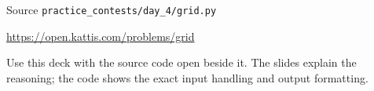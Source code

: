 \documentclass[aspectratio=169,11pt]{beamer}
\begin{document}
\begin{frame}{Source}
\small
{} \texttt{practice\_contests/day\_4/grid.py}

\vspace{0.3cm}
 \url{https://open.kattis.com/problems/grid}

\vspace{0.45cm}
Use this deck with the source code open beside it. The slides explain the reasoning; the code shows the exact input handling and output formatting.
\end{frame}
\end{document}
